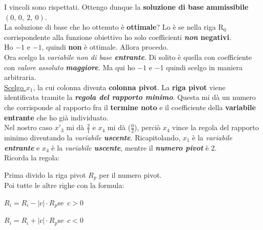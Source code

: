 \documentclass[12pt, a4paper, openany]{book}
\begin{document}
\noindent I vincoli sono rispettati. Ottengo dunque la \textbf{soluzione di base ammissibile} $(0,\, 0,\ 2,\ 0)$.\\
La soluzione di base che ho ottenuto è \textbf{ottimale}? Lo è se nella riga R$_0$ corrispondente alla funzione obiettivo ho solo coefficienti \textbf{\textit{non} negativi}.\\
\noindent Ho $-1$ e $-1$, quindi \textbf{non} è ottimale. Allora procedo.\\

\noindent Ora scelgo la \textit{variabile non di base \textbf{entrante}}. Di solito è quella con coefficiente con \textit{valore assoluto \textbf{maggiore}}. Ma qui ho $-1$ e $-1$ quindi scelgo in maniera arbitraria.\\
\noindent \underline{Scelgo $x_1$}, la cui colonna diventa \textbf{colonna pivot}. La \textbf{riga pivot} viene identificata tramite la \textbf{\textit{regola del rapporto minimo}}. Questa mi dà un numero che corrisponde al rapporto fra il \textbf{termine noto} e il coefficiente della \textbf{variabile entrante} che ho già individuato.\\
\noindent Nel nostro caso $x'_3$ mi dà $\frac{2}{1}$ e $x_4$ mi dà ($\frac{0}{2}$), perciò $x_4$ vince la regola del rapporto minimo diventando la \textit{variabile \textbf{uscente}}. Ricapitolando, $x_1$ è la \textit{variabile \textbf{entrante}} e $x_4$ è la \textit{variabile \textbf{uscente}}, mentre il \textit{\textbf{numero pivot}} è 2.\\
\noindent Ricorda la regola:
\begin{center}
    \noindent Prima divido la riga pivot $R_p$ per il numero pivot.\\ Poi tutte le altre righe con la formula:
\end{center}
\begin{center}
    $R_i = R_i - |c|\cdot R_p$\qquad se\ $c > 0$\\
\end{center}
\begin{center}
    $R_i = R_i + |c|\cdot R_p$\qquad se\ $c < 0$\\
\end{center}
\end{document}
